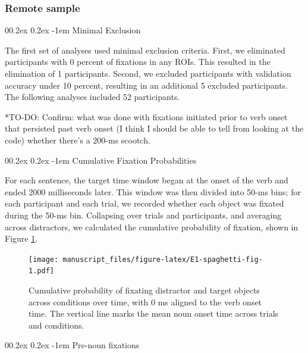 \documentclass[
  man,floatsintext]{apa6}
\makeatletter
\let\oldparagraph\paragraph
\renewcommand{\paragraph}[1]{\oldparagraph{#1}\mbox{}}
\renewcommand{\paragraph}{\@startsection{paragraph}{4}{\parindent}%
  {0\baselineskip \@plus 0.2ex \@minus 0.2ex}%
  {-1em}%
  {\normalfont\normalsize\bfseries\itshape\typesectitle}}
\makeatother
\begin{document}
\hypertarget{remote-sample-1}{%
\subsubsection{Remote sample}\label{remote-sample-1}}

\hypertarget{minimal-exclusion}{%
\paragraph{Minimal Exclusion}\label{minimal-exclusion}}

The first set of analyses used minimal exclusion criteria. First, we eliminated participants with 0 percent of fixations in any ROIs. This resulted in the elimination of 1 participants. Second, we excluded participants with validation accuracy under 10 percent, resulting in an additional 5 excluded participants. The following analyses included 52 participants.

*TO-DO: Confirm: what was done with fixations initiated prior to verb onset that persisted past verb onset (I think I should be able to tell from looking at the code) whether there's a 200-ms scootch.

\hypertarget{cumulative-fixation-probabilities}{%
\paragraph{Cumulative Fixation Probabilities}\label{cumulative-fixation-probabilities}}

For each sentence, the target time window began at the onset of the verb and ended 2000 milliseconds later. This window was then divided into 50-ms bins; for each participant and each trial, we recorded whether each object was fixated during the 50-ms bin. Collapsing over trials and participants, and averaging across distractors, we calculated the cumulative probability of fixation, shown in Figure \ref{fig:E1-spaghetti-fig}.

\begin{figure}
\centering
\texttt{[image: manuscript\_files/figure-latex/E1-spaghetti-fig-1.pdf]}
\caption{\label{fig:E1-spaghetti-fig}Cumulative probability of fixating distractor and target objects across conditions over time, with 0 ms aligned to the verb onset time. The vertical line marks the mean noun onset time across trials and conditions.}
\end{figure}

\hypertarget{pre-noun-fixations}{%
\paragraph{Pre-noun fixations}\label{pre-noun-fixations}}
\end{document}
